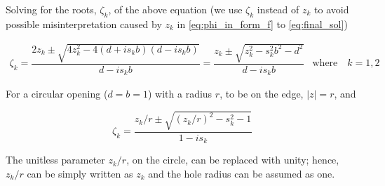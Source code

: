 Solving for the roots, $\zeta_k$, of the above equation (we use $\zeta_k$ instead of $z_k$ to avoid possible misinterpretation caused by $z_k$ in \cref{eq:phi_in_form_f} to \cref{eq:final_sol})

\begin{equation}
    \begin{matrix}
    \zeta_k = \dfrac{2 z_k \pm \sqrt{4 z_k^2 - 4(d + i s_k b) (d - i s_k b)}}{d - i s_k b} = \dfrac{z_k \pm \sqrt{z_k^2 - s_k^2 b^2 - d^2}}{d - i s_k b} &
    \text{where} \quad k = 1, 2
    \end{matrix}
    \label{eq:zeta_k_ellipse}
\end{equation}

For a circular opening ($d=b=1$) with a radius $r$, to be on the edge, $|z|=r$, and

\begin{equation}
    \zeta_k = \dfrac{z_k/r \pm \sqrt{(z_k/r)^2 - s_k^2 - 1}}{1 - i s_k}
    \label{eq:zeta_k_circle}
\end{equation}

The unitless parameter $z_k/r$, on the circle, can be replaced with unity; hence, $z_k/r$ can be simply written as $z_k$ and the hole radius can be assumed as one.

